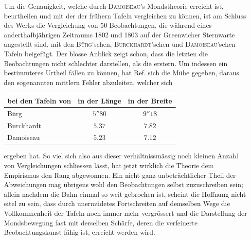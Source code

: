 Um die Genauigkeit, welche durch \textsc{Damoiseau}'s Mondstheorie erreicht ist, beurtheilen und mit der der frühern Tafeln vergleichen zu können, ist am Schluss des Werks die Vergleichung von 50 Beobachtungen, die während eines anderthalbjährigen Zeitraums 1802 und 1803 auf der Greenwicher Sternwarte angestellt sind, mit den \textsc{Bürg}'schen, \textsc{Burckhardt}'schen und \textsc{Damoiseau}'schen Tafeln beigefügt. Der blosse Anblick zeigt schon, dass die letzten die Beobachtungen nicht schlechter darstellen, als die erstern. Um indessen ein bestimmteres Urtheil fällen zu können, hat Ref. sich die Mühe gegeben, daraus den sogenannten mittlern Fehler abzuleiten, welcher sich
\begin{center}
\begin{tabular}{l|c|c}
bei den Tafeln von & in der Länge & in der Breite \\
\hline
Bürg & $5''80$ & $9''18$ \\
Burckhardt & $5.37$ & $7.82$ \\
Damoiseau & $5.23$ & $7.12$ \\
\end{tabular}
\end{center}
\noindent ergeben hat. So viel sich also aus dieser verhältnissmässig noch kleinen Anzahl von
Vergleichungen schliessen lässt, hat jetzt wirklich die Theorie dem Empirismus den Rang
abgewonnen. Ein nicht ganz  unbeträchtlicher Theil der Abweichungen mag übrigens wohl den Beobachtungen selbst zuzuschreiben sein; allein nachdem die Bahn einmal so weit gebrochen ist, scheint die Hoffnung nicht eitel zu sein, dass durch unermüdetes Fortschreiten auf demselben Wege die Vollkommenheit der Tafeln noch immer mehr vergrössert und die Darstellung der Mondsbewegung fast mit derselben Schärfe, deren die verfeinerte Beobachtungskunst fähig ist, erreicht werden wird.
